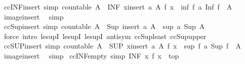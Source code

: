 \begin{isabellebody}
\endisatagproof
{\isafoldproof}%
%
\isadelimproof
\isanewline
%
\endisadelimproof
\isanewline
{}\isamarkupfalse%
\ ccINF{\isacharunderscore}insert\ {\isacharbrackleft}simp{\isacharbrackright}{\isacharcolon}\ {\isachardoublequoteopen}countable\ A\ {\isasymLongrightarrow}\ {\isacharparenleft}INF\ x{\isasymin}insert\ a\ A{\isachardot}\ f\ x{\isacharparenright}\ {\isacharequal}\ inf\ {\isacharparenleft}f\ a{\isacharparenright}\ {\isacharparenleft}Inf\ {\isacharparenleft}f\ {\isacharbackquote}\ A{\isacharparenright}{\isacharparenright}{\isachardoublequoteclose}\isanewline
%
\isadelimproof
\ \ %
\endisadelimproof
%
\isatagproof
{}\isamarkupfalse%
\ image{\isacharunderscore}insert\ \isamarkupfalse%
\ simp%
\endisatagproof
{\isafoldproof}%
%
\isadelimproof
\isanewline
%
\endisadelimproof
\isanewline
{}\isamarkupfalse%
\ ccSup{\isacharunderscore}insert\ {\isacharbrackleft}simp{\isacharbrackright}{\isacharcolon}\ {\isachardoublequoteopen}countable\ A\ {\isasymLongrightarrow}\ Sup\ {\isacharparenleft}insert\ a\ A{\isacharparenright}\ {\isacharequal}\ sup\ a\ {\isacharparenleft}Sup\ A{\isacharparenright}{\isachardoublequoteclose}\isanewline
%
\isadelimproof
\ \ %
\endisadelimproof
%
\isatagproof
{}\isamarkupfalse%
\ {\isacharparenleft}force\ intro{\isacharcolon}\ le{\isacharunderscore}supI\ le{\isacharunderscore}supI{}\ le{\isacharunderscore}supI{}\ antisym\ ccSup{\isacharunderscore}least\ ccSup{\isacharunderscore}upper{\isacharparenright}%
\endisatagproof
{\isafoldproof}%
%
\isadelimproof
\isanewline
%
\endisadelimproof
\isanewline
{}\isamarkupfalse%
\ ccSUP{\isacharunderscore}insert\ {\isacharbrackleft}simp{\isacharbrackright}{\isacharcolon}\ {\isachardoublequoteopen}countable\ A\ {\isasymLongrightarrow}\ {\isacharparenleft}SUP\ x{\isasymin}insert\ a\ A{\isachardot}\ f\ x{\isacharparenright}\ {\isacharequal}\ sup\ {\isacharparenleft}f\ a{\isacharparenright}\ {\isacharparenleft}Sup\ {\isacharparenleft}f\ {\isacharbackquote}\ A{\isacharparenright}{\isacharparenright}{\isachardoublequoteclose}\isanewline
%
\isadelimproof
\ \ %
\endisadelimproof
%
\isatagproof
{}\isamarkupfalse%
\ image{\isacharunderscore}insert\ \isamarkupfalse%
\ simp%
\endisatagproof
{\isafoldproof}%
%
\isadelimproof
\isanewline
%
\endisadelimproof
\isanewline
{}\isamarkupfalse%
\ ccINF{\isacharunderscore}empty\ {\isacharbrackleft}simp{\isacharbrackright}{\isacharcolon}\ {\isachardoublequoteopen}{\isacharparenleft}INF\ x{\isasymin}{\isacharbraceleft}{\isacharbraceright}{\isachardot}\ f\ x{\isacharparenright}\ {\isacharequal}\ top{\isachardoublequoteclose}\isanewline

\end{isabellebody}
